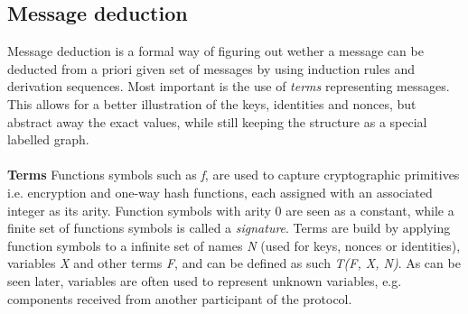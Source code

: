 \subsection{Message deduction}
Message deduction is a formal way of figuring out wether a message can be deducted from a priori given set of messages by using induction rules and derivation sequences. Most important is the use of \textit{terms} representing messages. This allows for a better illustration of the keys, identities and nonces, but abstract away the exact values, while still keeping the structure as a special labelled graph. \\ \\
\textbf{Terms} \qquad
Functions symbols such as \textit{f}, are used to capture cryptographic primitives i.e. encryption and one-way hash functions, each assigned with an associated integer as its arity. Function symbols with arity 0 are seen as a constant, while a finite set of functions symbols is called a \textit{signature}. Terms are build by applying function symbols to a infinite set of names \textit{N} (used for keys, nonces or identities), variables \textit{X} and other terms \textit{F}, and can be defined as such \textit{T(F, X, N)}. As can be seen later, variables are often used to represent unknown variables, e.g. components received from another participant of the protocol. \\

